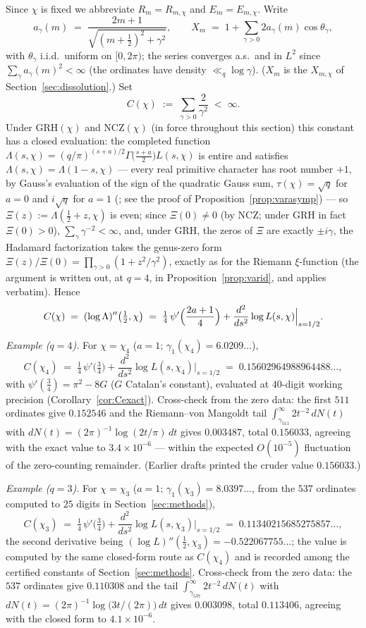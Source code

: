 \documentclass[11pt]{article}
\begin{document}
Since $\chi$ is fixed we abbreviate $R_m=R_{m,\chi}$ and
$E_m=E_{m,\chi}$. Write
\[
a_\gamma(m)\;=\;\frac{2m+1}{\sqrt{(m+\tfrac12)^2+\gamma^2}},
\qquad
X_m\;=\;1+\sum_{\gamma>0}2a_\gamma(m)\cos\theta_\gamma ,
\]
with $\theta_\gamma$ i.i.d.\ uniform on $[0,2\pi)$; the series converges
a.s.\ and in $L^2$ since $\sum_\gamma a_\gamma(m)^2<\infty$ (the
ordinates have density $\ll_q\log\gamma$). ($X_m$ is the $X_{m,\chi}$
of Section~\ref{sec:dissolution}.) Set
\[
C(\chi)\;:=\;\sum_{\gamma>0}\frac{2}{\gamma^2}\;<\;\infty .
\]
Under GRH$(\chi)$ and NCZ$(\chi)$ (in force throughout this section)
this constant has a closed evaluation: the completed function
$\Lambda(s,\chi)=(q/\pi)^{(s+a)/2}\Gamma\bigl(\tfrac{s+a}{2}\bigr)
L(s,\chi)$
is entire and satisfies $\Lambda(s,\chi)=\Lambda(1-s,\chi)$ --- every
real primitive character has root number $+1$, by Gauss's evaluation
of the sign of the quadratic Gauss sum, $\tau(\chi)=\sqrt q$ for
$a=0$ and $i\sqrt q$ for $a=1$ (\cite[Chs.~2, 9]{Dav00}; see the proof
of Proposition~\ref{prop:varasymp}) --- so
$\Xi(z):=\Lambda(\tfrac12+z,\chi)$ is even; since $\Xi(0)\ne0$ (by
NCZ; under GRH in fact $\Xi(0)>0$),
$\sum_\gamma\gamma^{-2}<\infty$,
and, under GRH, the zeros of $\Xi$ are exactly $\pm i\gamma$, the
Hadamard factorization takes the genus-zero form
$\Xi(z)/\Xi(0)=\prod_{\gamma>0}(1+z^2/\gamma^2)$, exactly as for the
Riemann $\xi$-function \cite[\S12]{Dav00} (the argument is written
out, at $q=4$, in Proposition~\ref{prop:varid}, and applies verbatim).
Hence
\[
C(\chi)\;=\;(\log\Lambda)''\bigl(\tfrac12,\chi\bigr)
\;=\;\tfrac14\,\psi'\Bigl(\frac{2a+1}{4}\Bigr)
+\frac{d^2}{ds^2}\log L(s,\chi)\Big|_{s=1/2}.
\]

\medskip\noindent\emph{Example ($q=4$).} For $\chi=\chi_4$ ($a=1$;
$\gamma_1(\chi_4)=6.0209\ldots$),
\[
C(\chi_4)\;=\;\tfrac14\,\psi'\bigl(\tfrac34\bigr)
+\frac{d^2}{ds^2}\log L(s,\chi_4)\Big|_{s=1/2}
\;=\;0.15602964988964488\ldots,
\]
with $\psi'(\tfrac34)=\pi^2-8G$ ($G$ Catalan's constant), evaluated at
$40$-digit working precision (Corollary~\ref{cor:Cexact}). Cross-check
from the zero data: the first
$511$ ordinates give $0.152546$ and the Riemann--von Mangoldt tail
$\int_{\gamma_{511}}^\infty 2t^{-2}\,dN(t)$ with
$dN(t)=(2\pi)^{-1}\log(2t/\pi)\,dt$ gives $0.003487$, total $0.156033$,
agreeing with the exact value to $3.4\times10^{-6}$ --- within the
expected $O(10^{-5})$ fluctuation of the zero-counting remainder.
(Earlier drafts printed the cruder value $0.156033$.)

\medskip\noindent\emph{Example ($q=3$).} For $\chi=\chi_3$ ($a=1$;
$\gamma_1(\chi_3)=8.0397\ldots$, from the $537$ ordinates computed to
$25$ digits in Section~\ref{sec:methods}),
\[
C(\chi_3)\;=\;\tfrac14\,\psi'\bigl(\tfrac34\bigr)
+\frac{d^2}{ds^2}\log L(s,\chi_3)\Big|_{s=1/2}
\;=\;0.11340215685275857\ldots,
\]
the second derivative being
$(\log L)''(\tfrac12,\chi_3)=-0.522067755\ldots$; the value is
computed by the same closed-form route as $C(\chi_4)$ and is recorded
among the certified constants of Section~\ref{sec:methods}.
Cross-check from the zero data: the $537$ ordinates give $0.110308$
and the tail $\int_{\gamma_{537}}^\infty 2t^{-2}\,dN(t)$ with
$dN(t)=(2\pi)^{-1}\log\bigl(3t/(2\pi)\bigr)\,dt$ gives $0.003098$,
total $0.113406$, agreeing with the closed form to
$4.1\times10^{-6}$.
\end{document}
